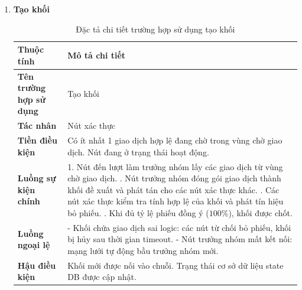 \documentclass[12pt,a4paper]{article}
\begin{document}
\begin{enumerate}[label=\textbf{\alph*)}]
    \item \textbf{Tạo khối}
    \begin{table}[H]
        \centering
        \renewcommand{\arraystretch}{1.4} %
        \begin{tabularx}{\textwidth}{|p{3.5cm}|X|}
            \hline
            \textbf{Thuộc tính} & \textbf{Mô tả chi tiết} \\ \hline
            \textbf{Tên trường hợp sử dụng} & Tạo khối \\ \hline
            \textbf{Tác nhân} & Nút xác thực \\ \hline
            \textbf{Tiền điều kiện} & Có ít nhất 1 giao dịch hợp lệ đang chờ trong vùng chờ giao dịch. Nút đang ở trạng thái hoạt động. \\ \hline
            \textbf{Luồng sự kiện chính} & 
            1. Nút đến lượt làm trưởng nhóm lấy các giao dịch từ vùng chờ giao dịch. \newline
            2. Nút trưởng nhóm đóng gói giao dịch thành khối đề xuất và phát tán cho các nút xác thực khác. \newline
            3. Các nút xác thực kiểm tra tính hợp lệ của khối và phát tín hiệu bỏ phiếu. \newline
            4. Khi đủ tỷ lệ phiếu đồng ý ($100\%$), khối được chốt. \\ \hline
            \textbf{Luồng ngoại lệ} & 
            - Khối chứa giao dịch sai logic: các nút từ chối bỏ phiếu, khối bị hủy sau thời gian timeout. \newline
            - Nút trưởng nhóm mất kết nối: mạng lưới tự động bầu trưởng nhóm mới. \\ \hline
            \textbf{Hậu điều kiện} & Khối mới được nối vào chuỗi. Trạng thái cơ sở dữ liệu state DB được cập nhật. \\ \hline
        \end{tabularx}
        \caption{Đặc tả chi tiết trường hợp sử dụng tạo khối}
        \label{tab:dac_ta_tao_block}
    \end{table}

    \newpage


\end{enumerate}
\end{document}
